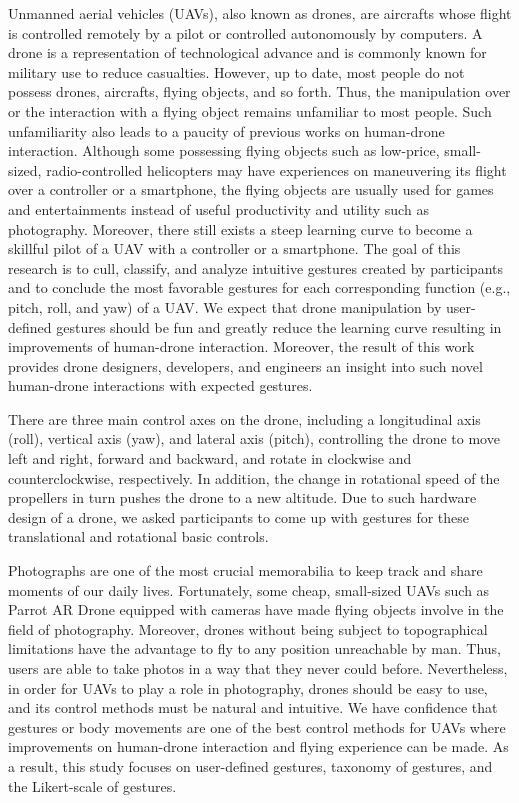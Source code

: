 \documentclass{sigchi}
\begin{document}
Unmanned aerial vehicles (UAVs), also known as drones, are aircrafts whose flight is controlled remotely by a pilot or controlled autonomously by computers. A drone is a representation of technological advance and is commonly known for military use to reduce casualties. However, up to date, most people do not possess drones, aircrafts, flying objects, and so forth. Thus, the manipulation over or the interaction with a flying object remains unfamiliar to most people. Such unfamiliarity also leads to a paucity of previous works on human-drone interaction. Although some possessing flying objects such as low-price, small-sized, radio-controlled helicopters may have experiences on maneuvering its flight over a controller or a smartphone, the flying objects are usually used for games and entertainments instead of useful productivity and utility such as photography. Moreover, there still exists a steep learning curve to become a skillful pilot of a UAV with a controller or a smartphone. The goal of this research is to cull, classify, and analyze intuitive gestures created by participants and to conclude the most favorable gestures for each corresponding function (e.g., pitch, roll, and yaw) of a UAV. We expect that drone manipulation by user-defined gestures should be fun and greatly reduce the learning curve resulting in improvements of human-drone interaction. Moreover, the result of this work provides drone designers, developers, and engineers an insight into such novel human-drone interactions with expected gestures.

There are three main control axes on the drone, including a longitudinal axis (roll), vertical axis (yaw), and lateral axis (pitch), controlling the drone to move left and right, forward and backward, and rotate in clockwise and counterclockwise, respectively. In addition, the change in rotational speed of the propellers in turn pushes the drone to a new altitude. Due to such hardware design of a drone, we asked participants to come up with gestures for these translational and rotational basic controls.

Photographs are one of the most crucial memorabilia to keep track and share moments of our daily lives. Fortunately, some cheap, small-sized UAVs such as Parrot AR Drone equipped with cameras have made flying objects involve in the field of photography. Moreover, drones without being subject to topographical limitations have the advantage to fly to any position unreachable by man. Thus, users are able to take photos in a way that they never could before. Nevertheless, in order for UAVs to play a role in photography, drones should be easy to use, and its control methods must be natural and intuitive. We have confidence that gestures or body movements are one of the best control methods for UAVs where improvements on human-drone interaction and flying experience can be made. As a result, this study focuses on user-defined gestures, taxonomy of gestures, and the Likert-scale of gestures.
\end{document}

